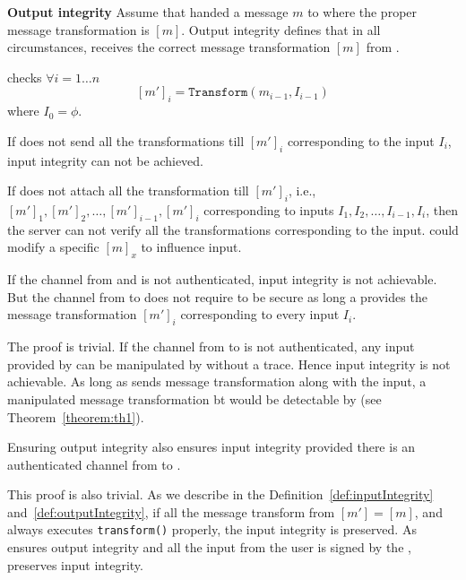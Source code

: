 \begin{definition}{\textbf{Output integrity}}
\label{def:outputIntegrity}
Assume that \server handed a message $m$ to \host where the proper message transformation is $[m]$. Output integrity defines that in all circumstances, \user receives the correct message transformation $[m]$ from \host.
\end{definition}

 \server checks $\forall i=1\ldots n$ $$[m']_i = \texttt{Transform}(m_{i-1}, I_{i-1})$$ where $I_0=\phi$.

\begin{theorem}
\label{theorem:th1}
If \user does not send all the transformations till $[m']_i$ corresponding to the input $I_i$, input integrity can not be achieved. 
\end{theorem}

\begin{IEEEproof}
If \user does not attach all the transformation till $[m']_i$, i.e., $[m']_1, [m']_2, \ldots, [m']_{i-1}, [m']_i$  corresponding to inputs $I_1, I_2,\ldots, I_{i-1}, I_i$, then the server can not verify all the transformations corresponding to the input. \host could modify a specific $[m]_x$ to influence \user input.
\end{IEEEproof}

\begin{theorem}
\label{theorem:th2}
If the channel from \user and \server is not authenticated, input integrity is not achievable. But the channel from \server to \user does not require to be secure as long a \user provides the message transformation $[m']_i$ corresponding to every input $I_i$.
\end{theorem}

\begin{IEEEproof}
The proof is trivial. If the channel from \user to \server is not authenticated, any input provided by \user can be manipulated by \host without a trace. Hence input integrity is not achievable. As long as \user sends message transformation along with the input, a manipulated message transformation bt \host would be detectable by \server (see Theorem~\ref{theorem:th1}).
\end{IEEEproof}

\begin{theorem}
\label{theorem:th3}
Ensuring output integrity also ensures input integrity provided there is an authenticated channel from \user to \server.
\end{theorem}

\begin{IEEEproof}
This proof is also trivial. As we describe in the Definition~\ref{def:inputIntegrity} and~\ref{def:outputIntegrity}, if all the message transform from \host $[m']=[m]$, and \host always executes \texttt{transform()} properly, the input integrity is preserved. As \name ensures output integrity and all the input from the user is signed by the \device, \name preserves input integrity. 
\end{IEEEproof}


